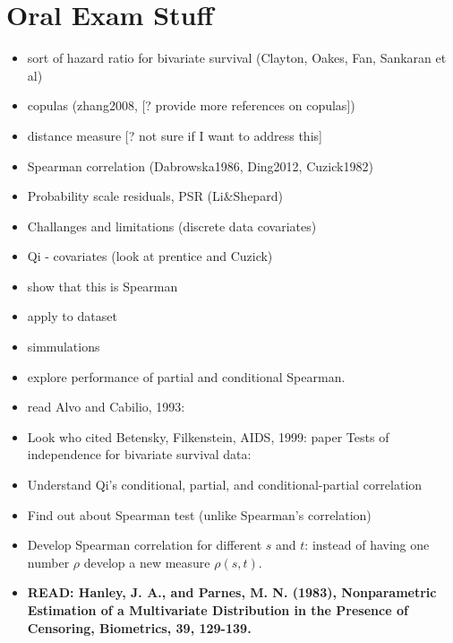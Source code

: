 \documentclass[]{article}
\begin{document}
\section{Oral Exam Stuff}
\begin{itemize}
	\item sort of hazard ratio for bivariate survival (Clayton, Oakes, Fan, Sankaran et al)
	\item copulas (zhang2008, [? provide more references on copulas])
	\item distance measure [? not sure if I want to address this]
	\item Spearman correlation (Dabrowska1986, Ding2012, Cuzick1982)
	\item Probability scale residuals, PSR (Li\&Shepard)
	\item Challanges and limitations (discrete data covariates)
	\item Qi - covariates (look at prentice and Cuzick)
	\item show that this is Spearman
	\item apply to dataset
	\item simmulations
	\item explore performance of partial and conditional Spearman.
	\item read Alvo and Cabilio, 1993:
	\item Look who cited Betensky, Filkenstein, AIDS, 1999: paper
Tests of independence for bivariate survival data:
	\item Understand Qi's conditional, partial, and conditional-partial correlation
	\item Find out about Spearman test (unlike Spearman's correlation)
	\item Develop Spearman correlation for different $s$ and $t$: instead of having one number $\rho$ develop a new measure $\rho(s, t)$.
	\item \textbf{READ: Hanley, J. A., and Parnes, M. N. (1983), Nonparametric Estimation of a Multivariate Distribution in the Presence of Censoring, Biometrics, 39, 129-139.}

\end{itemize}
~\\

\printbibliography
\end{document}

